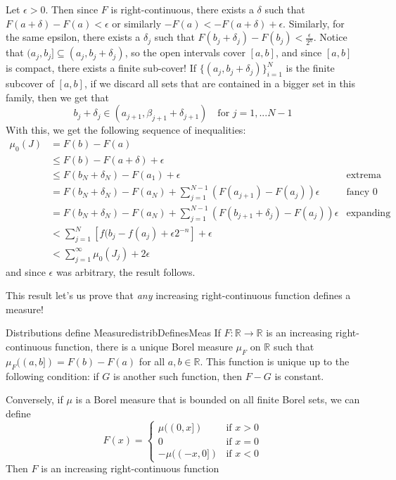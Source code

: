 \documentclass[oneside]{book}
\newcommand{\R}{\mathbb{R}}
\newcommand{\sse}{\subseteq}
\newcommand{\rw}{\rightarrow}
\begin{document}
\begin{Proof}
	Let $\epsilon > 0$. Then since $F$ is right-continuous, there exists a $\delta$ such that $F(a + \delta) - F(a)
	< \epsilon$ or similarly $-F(a) < -F(a+\delta) + \epsilon$. Similarly, for the same epsilon, there exists a $\delta_j$ such that $F(b_j + \delta_j) - F(b_j)
	< \frac{\epsilon}{2^n}$. Notice that $(a_j, b_j] \sse (a_j, b_j+\delta_j)$, so the open intervals cover $[a,b]$, and
	since $[a,b]$ is compact, there exists a finite sub-cover! If $\{(a_j, b_j+\delta_j)\}_{i=1}^N$ is the finite
	subcover of $[a,b]$, if we discard all sets that are contained in a bigger set in this family, then we get that 
	\[
		b_j + \delta_j \in (a_{j+1}, \beta_{j+1} + \delta_{j+1}) \quad \text{for $j = 1, ... N-1$}
	\]
	With this, we get the following sequence of inequalities:
	\begin{align*}
		\mu_0(J) &= F(b) - F(a)\\
 				 &\le F(b) - F(a + \delta) + \epsilon\\
 				 &\le F(b_N + \delta_N) - F(a_1) + \epsilon &\text{extrema of cover}\\
 				 &= F(b_N + \delta_N) - F(a_N) + \sum_{j=1}^{N-1} (F(a_{j+1}) - F(a_j)) \epsilon &\text{fancy $0$}\\
 				 &= F(b_N + \delta_N) - F(a_N) + \sum_{j=1}^{N-1} (F(b_{j+1} + \delta_j) - F(a_j)) \epsilon
 				 &\text{expanding}\\
				 &< \sum_{j=1}^N [f(b_j - f(a_j) + \epsilon2^{-n}] + \epsilon\\
				 &< \sum_{j=1}^\infty \mu_0(J_j) + 2\epsilon
	\end{align*}
	and since $\epsilon$ was arbitrary, the result follows. 
\end{Proof}

This result let's us prove that \emph{any} increasing right-continuous function defines a measure!

\begin{thm}{Distributions define Measure}{distribDefinesMeas}
	If $F: \R \rw \R$ is an increasing right-continuous function, there is a unique Borel measure $\mu_F$ on $\R$ such
	that $\mu_F((a,b]) = F(b) - F(a)$ for all $a,b \in \R$. This function is unique up to the following condition: if
	$G$ is another such function, then $F-G$ is constant.  

	Conversely, if $\mu$ is a Borel measure that is bounded on all finite Borel sets, we can define
	\[
		F(x) = \begin{cases}
				\mu((0,x]) &\text{if }x > 0\\
				0 &\text{if }x = 0\\
				-\mu((-x,0]) &\text{if }x < 0
			\end{cases}
		\]
		Then $F$ is an increasing right-continuous function
\end{thm}
\end{document}
